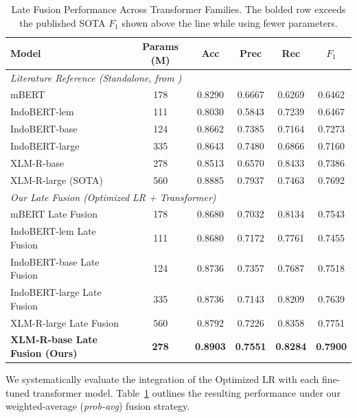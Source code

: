 \documentclass[conference]{IEEEtran}
\begin{document}
\begin{table}[t]
\caption{Late Fusion Performance Across Transformer Families. The bolded row exceeds the published SOTA $F_1$ shown above the line while using fewer parameters.}
\begin{center}
\begin{tabular}{lccccc}
\hline
\textbf{Model} & \textbf{Params (M)} & \textbf{Acc} & \textbf{Prec} & \textbf{Rec} & \textbf{$F_1$} \\ \hline
\multicolumn{6}{l}{\textit{Literature Reference (Standalone, from \cite{idsarcasm})}} \\
\quad mBERT & 178 & 0.8290 & 0.6667 & 0.6269 & 0.6462 \\
\quad IndoBERT-lem & 111 & 0.8030 & 0.5843 & 0.7239 & 0.6467 \\
\quad IndoBERT-base & 124 & 0.8662 & 0.7385 & 0.7164 & 0.7273 \\
\quad IndoBERT-large & 335 & 0.8643 & 0.7480 & 0.6866 & 0.7160 \\
\quad XLM-R-base & 278 & 0.8513 & 0.6570 & 0.8433 & 0.7386 \\
\quad XLM-R-large (SOTA) & 560 & 0.8885 & 0.7937 & 0.7463 & 0.7692 \\ \hline
\multicolumn{6}{l}{\textit{Our Late Fusion (Optimized LR + Transformer)}} \\
\quad mBERT Late Fusion & 178 & 0.8680 & 0.7032 & 0.8134 & 0.7543 \\
\quad IndoBERT-lem Late Fusion & 111 & 0.8680 & 0.7172 & 0.7761 & 0.7455 \\
\quad IndoBERT-base Late Fusion & 124 & 0.8736 & 0.7357 & 0.7687 & 0.7518 \\
\quad IndoBERT-large Late Fusion & 335 & 0.8736 & 0.7143 & 0.8209 & 0.7639 \\
\quad XLM-R-large Late Fusion & 560 & 0.8792 & 0.7226 & 0.8358 & 0.7751 \\
\quad \textbf{XLM-R-base Late Fusion (Ours)} & \textbf{278} & \textbf{0.8903} & \textbf{0.7551} & \textbf{0.8284} & \textbf{0.7900} \\ \hline
\end{tabular}
\label{tab:hybrid_results}
\end{center}
\end{table}

We systematically evaluate the integration of the Optimized LR with each fine-tuned transformer model. Table~\ref{tab:hybrid_results} outlines the resulting performance under our weighted-average (\textit{prob-avg}) fusion strategy.
\end{document}
